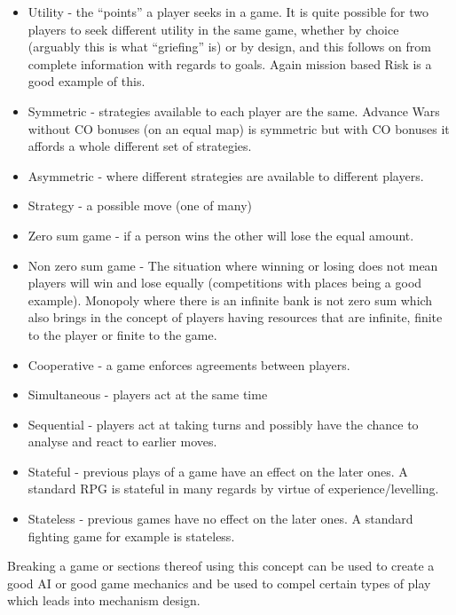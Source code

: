 \documentclass[
]{book}
\begin{document}
\begin{itemize}
\item
  Utility - the ``points'' a player seeks in a game. It is quite possible for two players to seek different utility in the same game, whether by choice (arguably this is what ``griefing'' is) or by design, and this follows on from complete information with regards to goals. Again mission based Risk is a good example of this.
\item
  Symmetric - strategies available to each player are the same. Advance Wars without CO bonuses (on an equal map) is symmetric but with CO bonuses it affords a whole different set of strategies.
\item
  Asymmetric - where different strategies are available to different players.
\item
  Strategy - a possible move (one of many)
\item
  Zero sum game - if a person wins the other will lose the equal amount.
\item
  Non zero sum game - The situation where winning or losing does not mean players will win and lose equally (competitions with places being a good example). Monopoly where there is an infinite bank is not zero sum which also brings in the concept of players having resources that are infinite, finite to the player or finite to the game.
\item
  Cooperative - a game enforces agreements between players.
\item
  Simultaneous - players act at the same time
\item
  Sequential - players act at taking turns and possibly have the chance to analyse and react to earlier moves.
\item
  Stateful - previous plays of a game have an effect on the later ones. A standard RPG is stateful in many regards by virtue of experience/levelling.
\item
  Stateless - previous games have no effect on the later ones. A standard fighting game for example is stateless.
\end{itemize}

Breaking a game or sections thereof using this concept can be used to create a good AI or good game mechanics and be used to compel certain types of play which leads into mechanism design.
\end{document}
